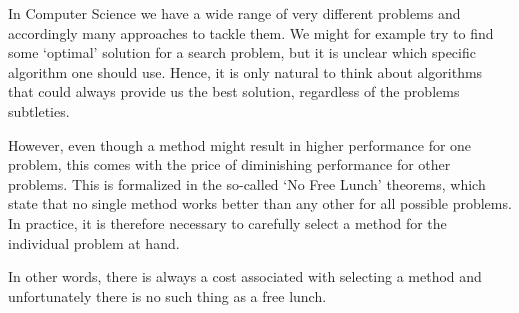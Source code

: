 
In Computer Science we have a wide range of very different problems and accordingly many approaches to tackle them.
We might for example try to find some `optimal' solution for a search problem, but it is unclear which specific algorithm one should use.
Hence, it is only natural to think about algorithms that could always provide us the best solution, regardless of the problems subtleties.

However, even though a method might result in higher performance for one problem, this comes with the price of diminishing performance for other problems.
This is formalized in the so-called `No Free Lunch' theorems, which state that no single method works better than any other for all possible problems.
In practice, it is therefore necessary to carefully select a method for the individual problem at hand.

In other words, there is always a cost associated with selecting a method and unfortunately there is no such thing as a free lunch.


